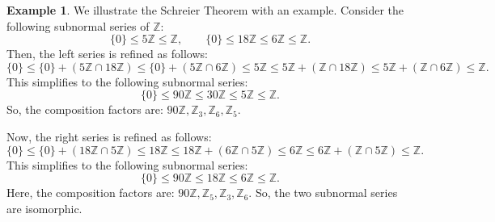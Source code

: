 \documentclass[a4paper, openany]{memoir}
\theoremstyle{definition}
\newtheorem{example}[definition]{Example}
\theoremstyle{plain}
\begin{document}
    \begin{example}
        We illustrate the Schreier Theorem with an example. Consider the following subnormal series of $\mathbb{Z}$:
        \[\{0\} \leq 5\mathbb{Z} \leq \mathbb{Z}, \qquad \{0\} \leq 18\mathbb{Z} \leq 6\mathbb{Z} \leq \mathbb{Z}.\]
        Then, the left series is refined as follows:
        \[\{0\} \leq \{0\} + (5\mathbb{Z} \cap 18\mathbb{Z}) \leq \{0\} + (5\mathbb{Z} \cap 6\mathbb{Z}) \leq 5\mathbb{Z} \leq 5\mathbb{Z} + (\mathbb{Z} \cap 18\mathbb{Z}) \leq 5\mathbb{Z} + (\mathbb{Z} \cap 6\mathbb{Z}) \leq \mathbb{Z}.\]
        This simplifies to the following subnormal series:
        \[\{0\} \leq 90\mathbb{Z} \leq 30\mathbb{Z} \leq 5\mathbb{Z} \leq \mathbb{Z}.\]
        So, the composition factors are: $90\mathbb{Z}, \mathbb{Z}_3, \mathbb{Z}_6, \mathbb{Z}_5$. 
        
        Now, the right series is refined as follows:
        \[\{0\} \leq \{0\} + (18\mathbb{Z} \cap 5\mathbb{Z}) \leq 18\mathbb{Z} \leq 18\mathbb{Z} + (6\mathbb{Z} \cap 5\mathbb{Z}) \leq 6\mathbb{Z} \leq 6\mathbb{Z} + (\mathbb{Z} \cap 5\mathbb{Z}) \leq \mathbb{Z}.\]
        This simplifies to the following subnormal series:
        \[\{0\} \leq 90\mathbb{Z} \leq 18\mathbb{Z} \leq 6\mathbb{Z} \leq \mathbb{Z}.\]
        Here, the composition factors are: $90\mathbb{Z}, \mathbb{Z}_5, \mathbb{Z}_3, \mathbb{Z}_6$. So, the two subnormal series are isomorphic.
    \end{example}
\end{document}
